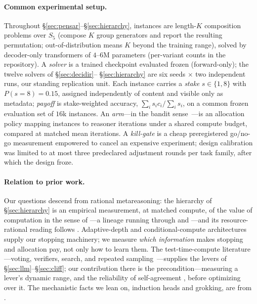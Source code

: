 \documentclass{article}
\begin{document}
\paragraph{Common experimental setup.} Throughout
\S\ref{sec:pensar}--\S\ref{sec:hierarchy}, instances are length-$K$
composition problems over $S_5$ (compose $K$ group generators and report
the resulting permutation; out-of-distribution means $K$ beyond the
training range), solved by decoder-only transformers of $4$--$6$M
parameters (per-variant counts in the repository). A \emph{solver} is a trained checkpoint evaluated frozen
(forward-only); the twelve solvers of \S\ref{sec:decidir}--%
\S\ref{sec:hierarchy} are six seeds $\times$ two independent runs, our
standing replication unit. Each instance carries a \emph{stake}
$s\in\{1,8\}$ with $P(s{=}8)=0.15$, assigned independently of content and
visible only as metadata; \emph{payoff} is stake-weighted accuracy,
$\sum_i s_i c_i / \sum_i s_i$, on a common frozen evaluation set of $16$k
instances. An \emph{arm}---in the bandit sense~\citep{gittins1979bandit,
lattimore2020bandit}---is an allocation policy mapping instances to
reasoner iterations under a shared compute budget, compared at matched
mean iterations. A \emph{kill-gate} is a cheap preregistered go/no-go
measurement empowered to cancel an expensive experiment; design
calibration was limited to at most three predeclared adjustment rounds
per task family, after which the design froze.

\paragraph{Relation to prior work.} Our questions descend from rational
metareasoning: the hierarchy of \S\ref{sec:hierarchy} is an empirical
measurement, at matched compute, of the value of computation in the sense
of \citet{russell1991metareasoning}---a lineage running through
\citet{horvitz1987reasoning} and \citet{hay2012selecting}---and its
resource-rational reading follows \citet{lieder2020resource}. Adaptive-depth and conditional-compute architectures
\citep{graves2016act,banino2021pondernet,dehghani2019universal,
elbayad2020depth,schwartz2020right,raposo2024mixture} supply our
stopping machinery; we measure \emph{which information} makes stopping and
allocation pay, not only how to learn them. The test-time-compute
literature---voting, verifiers, search, and repeated
sampling~\citep{wei2022chain,wang2023selfconsistency,cobbe2021training,
lightman2024let,yao2023tree,madaan2023self,brown2024monkeys,
snell2024scaling}---supplies the levers of
\S\ref{sec:llm}--\S\ref{sec:cliff}; our
contribution there is the precondition---measuring a lever's dynamic
range, and the reliability of self-agreement
\citep{kadavath2022know,lin2022teaching}, before optimizing over it. The mechanistic facts we lean on, induction
heads and grokking, are from
\citet{elhage2021mathematical,olsson2022induction,power2022grokking,
nanda2023progress}.
\end{document}
